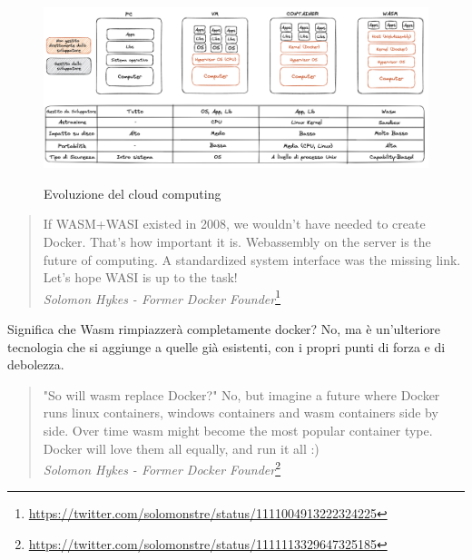 \begin{figure}[H]
    \centering
    \captionsetup{justification=centering}
    \includegraphics[width=15cm]{./chapters/1.introduction/images/7.wasi_cloud_lightweight.png}
    \label{wasi_wasi_cloud}
    \caption{Evoluzione del cloud computing}
\end{figure}

\begin{quote}
    If WASM+WASI existed in 2008, we wouldn't have needed to create Docker. That's how important it is. Webassembly on
    the server is the future of computing. A standardized system interface was the missing link. Let's hope WASI is up
    to the task! \\
    \textit{Solomon Hykes - Former Docker
    Founder}\footnote{\url{https://twitter.com/solomonstre/status/1111004913222324225}}
\end{quote}

Significa che Wasm rimpiazzerà completamente docker? No, ma è un'ulteriore tecnologia che si aggiunge a quelle già
esistenti, con i propri punti di forza e di debolezza.
\begin{quote}
    "So will wasm replace Docker?" No, but imagine a future where Docker runs linux containers, windows containers and
    wasm containers side by side. Over time wasm might become the most popular container type. Docker will love them all
    equally, and run it all :) \\
    \textit{Solomon Hykes - Former Docker
    Founder}\footnote{\url{https://twitter.com/solomonstre/status/1111113329647325185}}
\end{quote}
